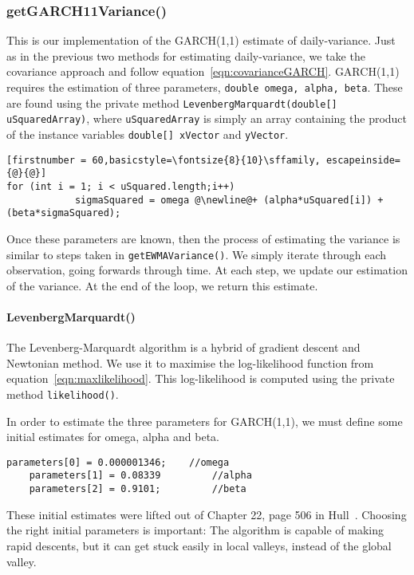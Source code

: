 \documentclass[../Dissertation.tex]{subfiles}
\begin{document}
\subsubsection{getGARCH11Variance()}

This is our implementation of the GARCH(1,1) estimate of daily-variance.
Just as in the previous two methods for estimating daily-variance, we take the covariance approach and follow equation~\ref{eqn:covarianceGARCH}.
GARCH(1,1) requires the estimation of three parameters, \lstinline|double omega, alpha, beta|.
These are found using the private method \lstinline|LevenbergMarquardt(double[] uSquaredArray)|, where \lstinline|uSquaredArray| is simply an array containing the product of the instance variables \lstinline|double[] xVector| and \lstinline|yVector|.
\begin{lstlisting}[firstnumber = 60,basicstyle=\fontsize{8}{10}\sffamily, escapeinside={@}{@}]
for (int i = 1; i < uSquared.length;i++)
            sigmaSquared = omega @\newline@+ (alpha*uSquared[i]) + (beta*sigmaSquared);
\end{lstlisting}
Once these parameters are known, then the process of estimating the variance is similar to steps taken in \lstinline|getEWMAVariance()|.
We simply iterate through each observation, going forwards through time.
At each step, we update our estimation of the variance.
At the end of the loop, we return this estimate.

\paragraph{LevenbergMarquardt()}

The Levenberg-Marquardt algorithm is a hybrid of gradient descent and Newtonian method.
We use it to maximise the log-likelihood function from equation~\ref{eqn:maxlikelihood}.
This log-likelihood is computed using the private method \lstinline|likelihood()|.

In order to estimate the three parameters for GARCH(1,1), we must define some initial estimates for omega, alpha and beta.
\begin{lstlisting}[firstnumber = 176]
	parameters[0] = 0.000001346;	//omega
	parameters[1] = 0.08339			//alpha
	parameters[2] = 0.9101;			//beta
\end{lstlisting}
These initial estimates were lifted out of Chapter 22, page 506 in Hull~\cite{Hull:2012}.
Choosing the right initial parameters is important: The algorithm is capable of making rapid descents, but it can get stuck easily in local valleys, instead of the global valley.
\end{document}
